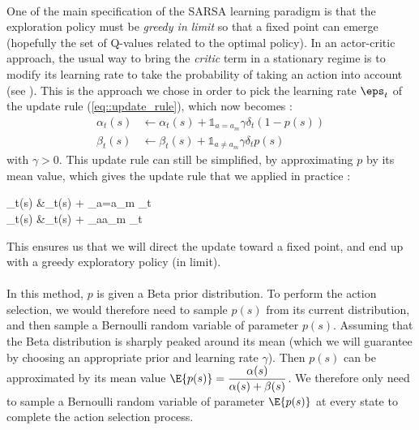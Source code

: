\documentclass[a4paper]{report}
\begin{document}
{{{{				\paragraph{} One of the main specification of the SARSA learning paradigm is that the exploration policy must be \emph{greedy in limit} so that a fixed point can emerge (hopefully the set of Q-values related to the optimal policy). In an actor-critic approach, the usual way to bring the \emph{critic} term in a stationary regime is to modify its learning rate to take the probability of taking an action into account (see \cite{Sutton98a}). \newline
				This is the approach we chose in order to pick the learning rate $\eps_t$ of the update rule (\ref{eq::update_rule}), which now becomes : 
			\begin{equation}
				\begin{aligned}
					\alpha_t(s) &\leftarrow \alpha_t(s) +  \mathds{1}_{a=a_m}\gamma \delta_t(1- p(s))\\
					\beta_t(s) &\leftarrow \beta_t(s) +   \mathds{1}_{a\neq a_m}\gamma \delta_t p(s)
				\end{aligned}
			\end{equation}
			with $\gamma >0$. This update rule can still be simplified, by approximating $p$ by its mean value, which gives the update rule that we applied in practice : 
			{
				\begin{aligned}
					\alpha_t(s) &\leftarrow \alpha_t(s) +  _{a=a_m} \delta_t \\
					\beta_t(s) &\leftarrow \beta_t(s) +   _{a\neq a_m}  \delta_t
				\end{aligned}
			}
			This ensures us that we will direct the update toward a fixed point, and end up with a greedy exploratory policy (in limit). 
			
			\paragraph{} In this method, $p$ is given a Beta prior distribution. To perform the action selection, we would therefore need to sample $p(s)$ from its current distribution, and then sample a Bernoulli random variable of parameter $p(s)$. Assuming that the Beta distribution is sharply peaked around its mean (which we will guarantee by choosing an appropriate prior and learning rate $\gamma$). Then $p(s)$ can be approximated by its mean value $\E{p(s)} = \displaystyle\frac{\alpha(s)}{\alpha(s) + \beta(s)}$. We therefore only need to sample a Bernoulli random variable of parameter $\E{p(s)}$ at every state to complete the action selection process. 
			
}}}}
\end{document}
